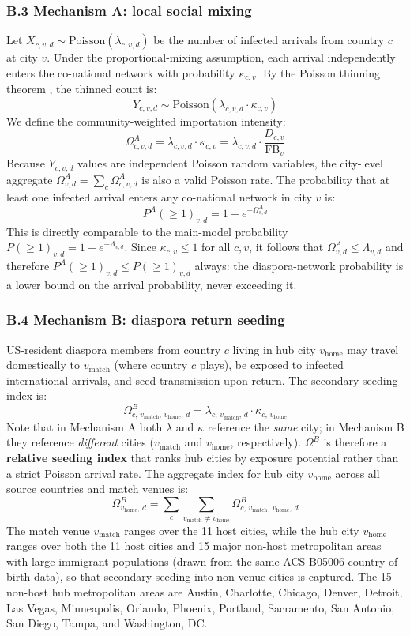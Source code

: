 \documentclass[12pt, a4paper]{article}
\begin{document}
\subsubsection*{B.3 Mechanism A: local social mixing}

Let $X_{c,v,d} \sim \text{Poisson}(\lambda_{c,v,d})$ be the number
of infected arrivals from country $c$ at city $v$. Under the
proportional-mixing assumption, each arrival independently enters
the co-national network with probability $\kappa_{c,v}$. By the
Poisson thinning theorem \citep{Ross2010}, the thinned count is:
\[
  Y_{c,v,d} \sim \text{Poisson}(\lambda_{c,v,d} \cdot \kappa_{c,v})
\]
We define the community-weighted importation intensity:
\[
  \Omega^A_{c,v,d} = \lambda_{c,v,d} \cdot \kappa_{c,v}
    = \lambda_{c,v,d} \cdot \frac{D_{c,v}}{\mathrm{FB}_{v}}
\]
Because $Y_{c,v,d}$ values are independent Poisson random variables,
the city-level aggregate $\Omega^A_{v,d} = \sum_c \Omega^A_{c,v,d}$
is also a valid Poisson rate. The probability that at least one
infected arrival enters any co-national network in city $v$ is:
\[
  P^A(\geq 1)_{v,d} = 1 - e^{-\Omega^A_{v,d}}
\]
This is directly comparable to the main-model probability
$P(\geq 1)_{v,d} = 1 - e^{-\Lambda_{v,d}}$. Since
$\kappa_{c,v} \leq 1$ for all $c,v$, it follows that
$\Omega^A_{v,d} \leq \Lambda_{v,d}$ and therefore
$P^A(\geq 1)_{v,d} \leq P(\geq 1)_{v,d}$ always: the
diaspora-network probability is a lower bound on the arrival
probability, never exceeding it.

\subsubsection*{B.4 Mechanism B: diaspora return seeding}

US-resident diaspora members from country $c$ living in hub city
$v_{\text{home}}$ may travel domestically to $v_{\text{match}}$
(where country $c$ plays), be exposed to infected international
arrivals, and seed transmission upon return. The secondary seeding
index is:
\[
  \Omega^B_{c,\,v_{\text{match}},\,v_{\text{home}},\,d}
    = \lambda_{c,\,v_{\text{match}},\,d}
      \cdot \kappa_{c,\,v_{\text{home}}}
\]
Note that in Mechanism A both $\lambda$ and $\kappa$ reference the
\emph{same} city; in Mechanism B they reference \emph{different}
cities ($v_{\text{match}}$ and $v_{\text{home}}$, respectively).
$\Omega^B$ is therefore a \textbf{relative seeding index} that
ranks hub cities by exposure potential rather than a strict Poisson
arrival rate. The aggregate index for hub city $v_{\text{home}}$
across all source countries and match venues is:
\[
  \Omega^B_{v_{\text{home}},\,d}
    = \sum_c \sum_{v_{\text{match}} \neq v_{\text{home}}}
      \Omega^B_{c,\,v_{\text{match}},\,v_{\text{home}},\,d}
\]
The match venue $v_{\text{match}}$ ranges over the 11 host cities, while the hub city $v_{\text{home}}$ ranges over both the 11 host cities and 15 major non-host metropolitan areas with large immigrant populations (drawn from the same ACS B05006 country-of-birth data), so that secondary seeding into non-venue cities
is captured. The 15 non-host hub metropolitan areas are Austin, Charlotte, Chicago,
Denver, Detroit, Las Vegas, Minneapolis, Orlando, Phoenix, Portland,
Sacramento, San Antonio, San Diego, Tampa, and Washington, DC.
\end{document}
